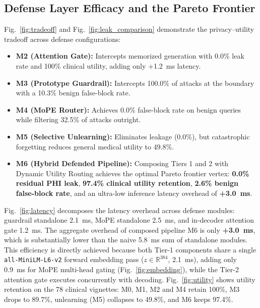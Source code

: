 \documentclass[lettersize,journal]{IEEEtran}
\begin{document}
\subsection{Defense Layer Efficacy and the Pareto Frontier}
Fig.~\ref{fig:tradeoff} and Fig.~\ref{fig:leak_comparison} demonstrate the privacy--utility tradeoff across defense configurations:
\begin{itemize}
    \item \textbf{M2 (Attention Gate):} Intercepts memorized generation with 0.0\% leak rate and 100\% clinical utility, adding only +1.2~ms latency.
    \item \textbf{M3 (Prototype Guardrail):} Intercepts 100.0\% of attacks at the boundary with a 10.3\% benign false-block rate.
    \item \textbf{M4 (MoPE Router):} Achieves 0.0\% false-block rate on benign queries while filtering 32.5\% of attacks outright.
    \item \textbf{M5 (Selective Unlearning):} Eliminates leakage (0.0\%), but catastrophic forgetting reduces general medical utility to 49.8\%.
    \item \textbf{M6 (Hybrid Defended Pipeline):} Composing Tiers 1 and 2 with Dynamic Utility Routing achieves the optimal Pareto frontier vertex: \textbf{0.0\% residual PHI leak}, \textbf{97.4\% clinical utility retention}, \textbf{2.6\% benign false-block rate}, and an ultra-low inference latency overhead of \textbf{+3.0~ms}.
\end{itemize}

Fig.~\ref{fig:latency} decomposes the latency overhead across defense modules: guardrail standalone 2.1~ms, MoPE standalone 2.5~ms, and in-decoder attention gate 1.2~ms. The aggregate overhead of composed pipeline M6 is only \textbf{+3.0~ms}, which is substantially lower than the naive 5.8~ms sum of standalone modules. This efficiency is directly achieved because both Tier-1 components share a single \texttt{all-MiniLM-L6-v2} forward embedding pass ($z \in \mathbb{R}^{384}$, 2.1~ms), adding only 0.9~ms for MoPE multi-head gating (Fig.~\ref{fig:embedding}), while the Tier-2 attention gate executes concurrently with decoding.
Fig.~\ref{fig:utility} shows utility retention on the 78 clinical vignettes: M0, M1, M2 and M4 retain 100\%, M3 drops to 89.7\%, unlearning (M5) collapses to 49.8\%, and M6 keeps 97.4\%.
\end{document}

